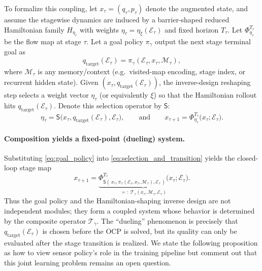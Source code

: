 \documentclass{article} %
\begin{document}
To formalize this coupling, let $x_\tau=(q_\tau,p_\tau)$ denote the augmented state, and assume the stagewise dynamics are induced
by a barrier-shaped reduced Hamiltonian family $H_{\eta_\tau}$ with weights $\eta_\tau=\eta_\xi(\mathcal E_\tau)$ and fixed horizon $T_\tau$.
Let $\Phi^{T_\tau}_{\eta_\tau}$ be the flow map at stage $\tau$. Let a goal policy $\pi_\gamma$ output the next stage terminal goal as
\begin{equation}
q_{\mathrm{target}}(\mathcal{E}_\tau) = \pi_\gamma(\mathcal E_\tau, x_\tau, \mathcal M_\tau),
\label{eq:goal_policy}
\end{equation}
where $\mathcal M_\tau$ is any memory/context (e.g.\ visited-map encoding, stage index, or recurrent hidden state).
Given $(x_\tau,q_{\mathrm{target}}(\mathcal{E}_{\tau}))$, the inverse-design reshaping step selects a weight vector $\eta_\tau$ (or equivalently $\xi$) so that the Hamiltonian rollout hits $q_{\mathrm{target}}(\mathcal{E}_{\tau})$.
Denote this selection operator by $\mathsf S$:
\begin{equation}
\eta_\tau = \mathsf S\big(x_\tau,q_{\mathrm{target}}(\mathcal{E}_{\tau}),\mathcal E_\tau\big),
\qquad\text{and}\qquad
x_{\tau+1} = \Phi^{T_\tau}_{\eta_\tau}\big(x_\tau;\mathcal E_\tau\big).
\label{eq:selection_and_transition}
\end{equation}

\paragraph{Composition yields a fixed-point (dueling) system.}
Substituting \cref{eq:goal_policy} into \cref{eq:selection_and_transition} yields the closed-loop stage map
\begin{equation}
x_{\tau+1}
=
\underbrace{\Phi^{T_\tau}_{\mathsf S(\,x_\tau,\pi_\gamma(\mathcal E_\tau,x_\tau,\mathcal M_\tau),\mathcal E_\tau\,)}
\big(x_\tau;\mathcal E_\tau\big)}_{=:~\mathcal T_{\gamma}(x_\tau,\mathcal M_\tau,\mathcal E_\tau)}.
\label{eq:closed_loop_stage_map}
\end{equation}
Thus the goal policy and the Hamiltonian-shaping inverse design are not independent modules; they form a coupled system
whose behavior is determined by the composite operator $\mathcal T_{\gamma}$.
The “dueling” phenomenon is precisely that $q_{\mathrm{target}}(\mathcal{E}_{\tau})$ is chosen before the OCP is solved, but its quality
can only be evaluated after the stage transition is realized. We state the following proposition as how to view sensor policy's role in the training pipeline but comment out that this joint learning problem remains an open question.
\end{document}
